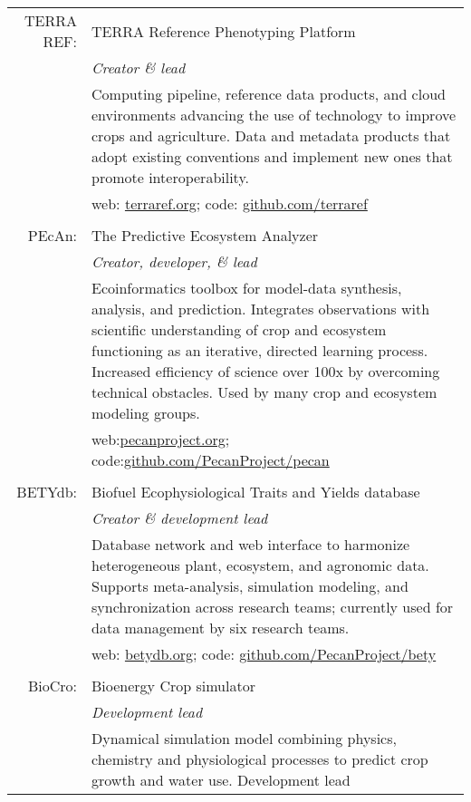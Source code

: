 \documentclass[a4paper,10pt]{article}
\begin{document}
\begin{tabular}{rp{11cm}}
TERRA REF:&TERRA Reference Phenotyping Platform\\
& \small \textit{Creator \& lead}\\
& \small Computing pipeline, reference data products, and cloud environments advancing the use of technology to improve crops and agriculture. Data and metadata products that adopt existing conventions and implement new ones that promote interoperability.\\
& \small web: \href{http://www.terraref.org}{terraref.org}; code:  \href{https://github.com/terraref}{github.com/terraref}\\
\multicolumn{2}{c}{} \\
PEcAn:&The Predictive Ecosystem Analyzer\\
& \small \textit{Creator, developer, \& lead}\\
& \small Ecoinformatics toolbox for model-data synthesis, analysis, and prediction. Integrates observations with scientific understanding of crop and ecosystem functioning as an iterative, directed learning process. Increased efficiency of science over 100x by overcoming technical obstacles. Used by many crop and ecosystem modeling groups.\\
& \small web:\href{http://www.pecanproject.org}{pecanproject.org};  code:\href{https://github.com/PecanProject/pecan}{github.com/PecanProject/pecan}\\
\multicolumn{2}{c}{} \\
BETYdb:&Biofuel Ecophysiological Traits and Yields database\\
& \small \textit{Creator \& development lead}\\
& \small{Database network and web interface to harmonize heterogeneous plant, ecosystem, and agronomic data. Supports meta-analysis, simulation modeling, and synchronization across research teams; currently used for data management by six research teams.}\\
& \small web: \href{http://www.betydb.org}{betydb.org}; code:  \href{https://github.com/PecanProject/bety}{github.com/PecanProject/bety}\\
\multicolumn{2}{c}{} \\
BioCro:&Bioenergy Crop simulator\\
& \small \textit{Development lead}\\
& \small Dynamical simulation model combining physics, chemistry and physiological processes to predict crop growth and water use. Development lead\\

\end{tabular}
\end{document}
